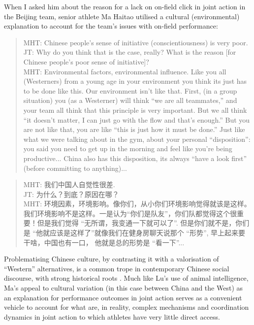 \begin{CJK}{UTF8}{gbsn}
When I asked him about the reason for a lack on on-field click in joint action in the Beijing team, senior athlete Ma Haitao utilised a cultural (environmental) explanation to account for the team's issues with on-field performance:

\begin{quote}
  MHT: Chinese people's sense of initiative (conscientiousness) is very poor.\\
  JT: Why do you think that is the case, really? What is the reason [for Chinese people's poor sense of initiative]? \\ MHT: Environmental factors, environmental influence.  Like you all (Westerners) from a young age in your environment you think its just has to be done like this.  Our environment isn’t like that.  First, (in a group situation) you (as a Westerner) will think ``we are all teammates,'' and your team all think that this principle is very important.  But we all think ``it doesn’t matter, I can just go with the flow and that’s enough.''  But you are not like that, you are like ``this is just how it must be done.'' Just like what we were talking about in the gym, about your personal ``disposition'': you said you need to get up in the morning and feel like you're being productive... China also has this disposition, its always ``have a look first'' (before committing to anything)...
\end{quote}

\begin{quote}
  MHT: 我们中国人自觉性很差. \\
  JT: 为什么？到底？原因在哪？\\
  MHT: 环境因素，环境影响。像你们，从小你们环境影响觉得就该是这样。我们环境影响不是这样。一是认为``你们是队友''，你们队都觉得这个很重要！但是我们觉得 ``无所谓，我变通一下就可以了''. 但是你们就不是，你们是 ``他就应该是这样了''就像我们在健身房聊天说那个 ``形势'', 早上起来要干啥，中国也有一口， 他就是总的形势是  ``看一下''...
\end{quote}

Problematising Chinese culture, by contrasting it with a valorisation of ``Western'' alternatives, is a common trope in contemporary Chinese social discourse, with strong historical roots \citep{Liu1995a}.  Much like Lu's use of animal intelligence, Ma's appeal to cultural variation (in this case between China and the West) as an explanation for performance outcomes in joint action serves as a convenient vehicle to account for what are, in reality, complex mechanisms and coordination dynamics in joint action to which athletes have very little direct access.


\end{CJK}
